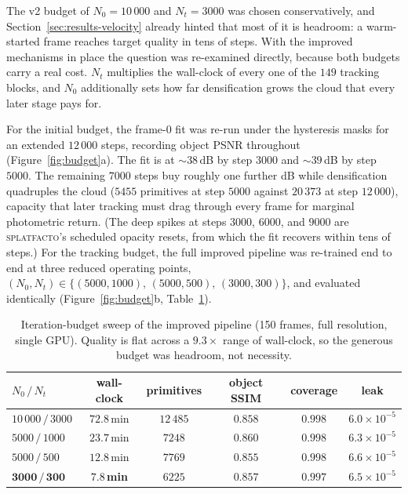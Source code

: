 The v2 budget of $N_0 = 10\,000$ and $N_t = 3000$ was chosen conservatively, and
Section~\ref{sec:results-velocity} already hinted that most of it is headroom: a
warm-started frame reaches target quality in tens of steps. With the improved
mechanisms in place the question was re-examined directly, because both budgets carry
a real cost. $N_t$ multiplies the wall-clock of every one of the $149$ tracking
blocks, and $N_0$ additionally sets how far densification grows the cloud that every
later stage pays for.

For the initial budget, the frame-0 fit was re-run under the hysteresis masks for an
extended $12\,000$ steps, recording object PSNR throughout
(Figure~\ref{fig:budget}a). The fit is at ${\sim}38$\,dB by step $3000$ and
${\sim}39$\,dB by step $5000$. The remaining $7000$ steps buy roughly one further dB
while densification quadruples the cloud ($5455$ primitives at step $5000$ against
$20\,373$ at step $12\,000$), capacity that later tracking must drag through every
frame for marginal photometric return. (The deep spikes at steps $3000$, $6000$, and
$9000$ are \textsc{splatfacto}'s scheduled opacity resets, from which the fit recovers within
tens of steps.) For the tracking budget, the full improved pipeline was re-trained
end to end at three reduced operating points, $(N_0, N_t) \in \{(5000, 1000),\,
(5000, 500),\, (3000, 300)\}$, and evaluated identically
(Figure~\ref{fig:budget}b, Table~\ref{tab:budget}).

\begin{table}[!ht]
    \centering
    \begin{tabular}{lccccc}
        \toprule
        $N_0 \,/\, N_t$ & wall-clock & primitives & object SSIM & coverage & leak \\
        \midrule
        $10\,000 \,/\, 3000$ & $72.8$\,min & $12\,485$ & $0.858$ & $0.998$ & $6.0\times10^{-5}$ \\
        $5000 \,/\, 1000$    & $23.7$\,min & $7248$    & $\mathbf{0.860}$ & $0.998$ & $6.3\times10^{-5}$ \\
        $5000 \,/\, 500$     & $12.8$\,min & $7769$    & $0.855$ & $0.998$ & $6.6\times10^{-5}$ \\
        $\mathbf{3000 \,/\, 300}$ & $\mathbf{7.8}$\,\textbf{min} & $6225$ & $0.857$ & $0.997$ & $6.5\times10^{-5}$ \\
        \bottomrule
    \end{tabular}
    \caption{Iteration-budget sweep of the improved pipeline (150 frames, full
    resolution, single GPU). Quality is flat across a ${9.3\times}$ range of
    wall-clock, so the generous budget was headroom, not necessity.}
    \label{tab:budget}
\end{table}

